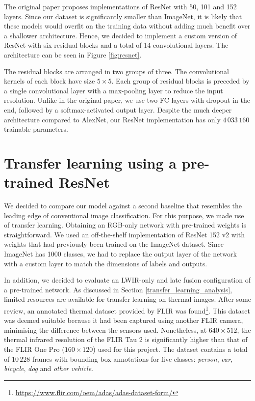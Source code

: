 \documentclass{l4proj}
\begin{document}
The original paper proposes implementations of ResNet with 50, 101 and 152 layers. Since our dataset is significantly smaller than ImageNet, it is likely that these models would overfit on the training data without adding much benefit over a shallower architecture. Hence, we decided to implement a custom version of ResNet with six residual blocks and a total of 14 convolutional layers. The architecture can be seen in Figure \ref{fig:resnet}.

The residual blocks are arranged in two groups of three. The convolutional kernels of each block have size $5 \times 5$. Each group of residual blocks is preceded by a single convolutional layer with a max-pooling layer to reduce the input resolution. Unlike in the original paper, we use two FC layers with dropout in the end, followed by a softmax-activated output layer. Despite the much deeper architecture compared to AlexNet, our ResNet implementation has only $4\,033\,160$ trainable parameters.



\section{Transfer learning using a pre-trained ResNet}
\label{transfer_learning}

We decided to compare our model against a second baseline that resembles the leading edge of conventional image classification. For this purpose, we made use of transfer learning. Obtaining an RGB-only network with pre-trained weights is straightforward. We used an off-the-shelf implementation of ResNet 152 v2 \citep{he_identity_2016} with weights that had previously been trained on the ImageNet dataset. Since ImageNet has 1000 classes, we had to replace the output layer of the network with a custom layer to match the dimensions of labels and outputs.

In addition, we decided to evaluate an LWIR-only and late fusion configuration of a pre-trained network. As discussed in Section \ref{transfer_learning_analysis}, limited resources are available for transfer learning on thermal images. After some review, an annotated thermal dataset provided by FLIR was found\footnote{\url{https://www.flir.com/oem/adas/adas-dataset-form/}}. This dataset was deemed suitable because it had been captured using another FLIR camera, minimising the difference between the sensors used. Nonetheless, at $640 \times 512$, the thermal infrared resolution of the FLIR Tau 2 is significantly higher than that of the FLIR One Pro ($160 \times 120$) used for this project. The dataset contains a total of $10\,228$ frames with bounding box annotations for five classes: \textit{person}, \textit{car}, \textit{bicycle}, \textit{dog} and \textit{other vehicle}.
\end{document}
